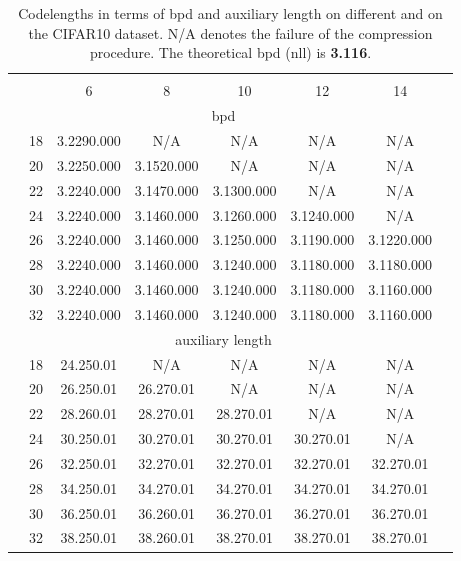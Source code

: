 \documentclass{article}
\newcommand{\ebar}[1]{{\tiny #1}}
\begin{document}
\begin{table}[ht]
\centering
\caption{Codelengths in terms of bpd and auxiliary length on different  and  on the CIFAR10 dataset. N/A denotes the failure of the compression procedure. The theoretical bpd (nll) is \textbf{3.116}.}
\small
\label{tab:hparam_c10}
\begin{tabular}{cccccccc}
\toprule
    & & \multicolumn{5}{c}{} \\
     &  & 6 & 8 & 10 & 12 & 14 \\
    \midrule
    \multicolumn{7}{c}{bpd} \\
    \midrule
    \multirow{8}{*}{} & 18 & 3.229\ebar{0.000} & N/A & N/A & N/A & N/A \\
        & 20 & 3.225\ebar{0.000} & 3.152\ebar{0.000} & N/A & N/A & N/A \\
        & 22 & 3.224\ebar{0.000} & 3.147\ebar{0.000} & 3.130\ebar{0.000} & N/A & N/A \\
        & 24 & 3.224\ebar{0.000} & 3.146\ebar{0.000} & 3.126\ebar{0.000} & 3.124\ebar{0.000} & N/A \\
        & 26 & 3.224\ebar{0.000} & 3.146\ebar{0.000} & 3.125\ebar{0.000} & 3.119\ebar{0.000} & 3.122\ebar{0.000} \\
        & 28 & 3.224\ebar{0.000} & 3.146\ebar{0.000} & 3.124\ebar{0.000} & 3.118\ebar{0.000} & 3.118\ebar{0.000} \\
        & 30 & 3.224\ebar{0.000} & 3.146\ebar{0.000} & 3.124\ebar{0.000} & 3.118\ebar{0.000} & 3.116\ebar{0.000} \\
        & 32 & 3.224\ebar{0.000} & 3.146\ebar{0.000} & 3.124\ebar{0.000} & 3.118\ebar{0.000} & 3.116\ebar{0.000} \\
    \midrule
    \multicolumn{7}{c}{auxiliary length} \\
    \midrule
    \multirow{8}{*}{} & 18 & 24.25\ebar{0.01} & N/A & N/A & N/A & N/A \\
        & 20 & 26.25\ebar{0.01} & 26.27\ebar{0.01} & N/A & N/A & N/A \\
        & 22 & 28.26\ebar{0.01} & 28.27\ebar{0.01} & 28.27\ebar{0.01} & N/A & N/A \\
        & 24 & 30.25\ebar{0.01} & 30.27\ebar{0.01} & 30.27\ebar{0.01} & 30.27\ebar{0.01} & N/A \\
        & 26 & 32.25\ebar{0.01} & 32.27\ebar{0.01} & 32.27\ebar{0.01} & 32.27\ebar{0.01} & 32.27\ebar{0.01} \\
        & 28 & 34.25\ebar{0.01} & 34.27\ebar{0.01} & 34.27\ebar{0.01} & 34.27\ebar{0.01} & 34.27\ebar{0.01} \\
        & 30 & 36.25\ebar{0.01} & 36.26\ebar{0.01} & 36.27\ebar{0.01} & 36.27\ebar{0.01} & 36.27\ebar{0.01} \\
        & 32 & 38.25\ebar{0.01} & 38.26\ebar{0.01} & 38.27\ebar{0.01} & 38.27\ebar{0.01} & 38.27\ebar{0.01} \\
\bottomrule
\end{tabular}
\end{table}
\end{document}
